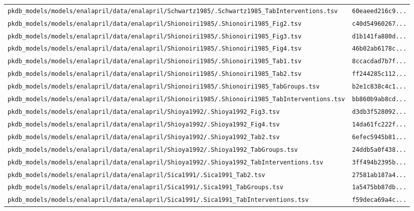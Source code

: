 \begin{longtable}{ll}
\texttt{pkdb\_models/models/enalapril/data/enalapril/Schwartz1985/.Schwartz1985\_TabInterventions.tsv} & \texttt{60eaeed216c9...} \\
\texttt{pkdb\_models/models/enalapril/data/enalapril/Shionoiri1985/.Shionoiri1985\_Fig2.tsv} & \texttt{c40d54960267...} \\
\texttt{pkdb\_models/models/enalapril/data/enalapril/Shionoiri1985/.Shionoiri1985\_Fig3.tsv} & \texttt{d1b141fa880d...} \\
\texttt{pkdb\_models/models/enalapril/data/enalapril/Shionoiri1985/.Shionoiri1985\_Fig4.tsv} & \texttt{46b02ab6178c...} \\
\texttt{pkdb\_models/models/enalapril/data/enalapril/Shionoiri1985/.Shionoiri1985\_Tab1.tsv} & \texttt{8ccacdad7b7f...} \\
\texttt{pkdb\_models/models/enalapril/data/enalapril/Shionoiri1985/.Shionoiri1985\_Tab2.tsv} & \texttt{ff244285c112...} \\
\texttt{pkdb\_models/models/enalapril/data/enalapril/Shionoiri1985/.Shionoiri1985\_TabGroups.tsv} & \texttt{b2e1c838c4c1...} \\
\texttt{pkdb\_models/models/enalapril/data/enalapril/Shionoiri1985/.Shionoiri1985\_TabInterventions.tsv} & \texttt{bb860b9ab8cd...} \\
\texttt{pkdb\_models/models/enalapril/data/enalapril/Shioya1992/.Shioya1992\_Fig3.tsv} & \texttt{d3db3f528092...} \\
\texttt{pkdb\_models/models/enalapril/data/enalapril/Shioya1992/.Shioya1992\_Fig4.tsv} & \texttt{14da61fc222f...} \\
\texttt{pkdb\_models/models/enalapril/data/enalapril/Shioya1992/.Shioya1992\_Tab2.tsv} & \texttt{6efec5945b81...} \\
\texttt{pkdb\_models/models/enalapril/data/enalapril/Shioya1992/.Shioya1992\_TabGroups.tsv} & \texttt{24ddb5a0f438...} \\
\texttt{pkdb\_models/models/enalapril/data/enalapril/Shioya1992/.Shioya1992\_TabInterventions.tsv} & \texttt{3ff494b2395b...} \\
\texttt{pkdb\_models/models/enalapril/data/enalapril/Sica1991/.Sica1991\_Tab2.tsv} & \texttt{27581ab187a4...} \\
\texttt{pkdb\_models/models/enalapril/data/enalapril/Sica1991/.Sica1991\_TabGroups.tsv} & \texttt{1a5475bb87db...} \\
\texttt{pkdb\_models/models/enalapril/data/enalapril/Sica1991/.Sica1991\_TabInterventions.tsv} & \texttt{f59deca69a4c...} \\

\end{longtable}
